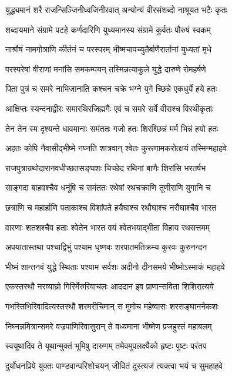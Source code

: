 \twolineshloka
{युद्ध्यमानं शरै राजन्सिञ्जिनीध्वजिनीरवात्}
{अन्योन्यं वीरसंशब्दो नाश्रूयत भटैः कृतः}


\twolineshloka
{शब्दायमाने संग्रामे पटहे कर्णदारिणि}
{युध्यमानस्य संग्रामे कुर्वतः पौरुषं स्वकम्}


\twolineshloka
{नाश्रौषं नामगोत्राणि कीर्तनं च परस्परम्}
{भीष्मचापच्युतैर्बाणैरार्तानां युध्यतां मृधे}


\twolineshloka
{परस्परेषां वीराणां मनांसि समकम्पयन्}
{तस्मिन्नत्याकुले युद्धे दारुणे रोमहर्षणे}


\twolineshloka
{पिता पुत्रं च समरे नाभिजानाति कश्चन}
{चक्रे भग्ने युगे च्छिन्ने एकधुर्ये हये हतः}


\twolineshloka
{आक्षिप्तः स्यन्दनाद्वीरः समारथिरजिह्मगैः}
{एवं च समरे सर्वे वीराश्च विरथीकृताः}


\twolineshloka
{तेन तेन स्म दृश्यन्ते धावमानाः समंततः}
{गजो हतः शिरश्छिन्नं मर्म भिन्नं हयो हतः}


\twolineshloka
{अहतः कोपि नैवासीद्भीष्मे नघ्नति शात्रवान्}
{श्वेतः कुरूणामकरोत्क्षयं तस्मिन्महाहवे}


\twolineshloka
{राजपुत्रान्रथोदारानवधीच्छतसङ्घशः}
{चिच्छेद रथिनां बाणैः शिरांसि भरतर्षभ}


\twolineshloka
{साङ्गदा बाहवश्चैव धनूंषि च समंततः}
{रथेषां रथचक्राणि तूणीराणि युगानि च}


\twolineshloka
{छत्राणि च महार्हाणि पताकाश्च विशांपते}
{हयैघाश्च रथौघाश्च नरौघाश्चैव भारत}


\twolineshloka
{वारणाः शतशश्चैव हताः श्वेतेन भारत}
{वयं श्वेतभयाद्भीता विहाय रथसत्तमम्}


\twolineshloka
{अपयातास्तथा पश्चाद्विभुं पश्याम धृष्णवः}
{शरपातमतिक्रम्य कुरवः कुरुनन्दन}


\twolineshloka
{भीष्मं शान्तनवं युद्धे स्थिताः पश्याम सर्वशः}
{अदीनो दीनसमये भीष्मोऽस्माकं महाहवे}


\twolineshloka
{एकस्तस्थौ नरव्याघ्रो गिरिर्मेरुरिवाचलः}
{आददान इव प्राणान्सविता शिशिरात्यये}


\twolineshloka
{गभस्तिभिरिवादित्यस्तस्थौ शरमरीचिमान्}
{स मुमोच महेष्वासः शरसङ्घाननेकशः}


\twolineshloka
{निघ्नन्नमित्रान्समरे वज्रपाणिरिवासुरान्}
{ते वध्यमाना भीष्मेण प्रजहुस्तं महाबलम्}


\twolineshloka
{स्वयूथादिव ते यूथान्मुक्तं भूमिषु दारुणम्}
{तमेवमुपलक्ष्यैको हृष्टः पुष्टः परंतप}


\twolineshloka
{दुर्योधनप्रिये युक्तः पाण्डवान्परिशोचयन्}
{जीवितं दुस्त्यजं त्यक्त्वा भयं च सुमहाहवे}


